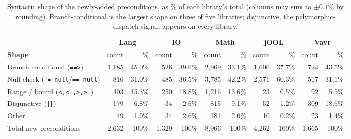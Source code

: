 \begin{table}[ht]
\centering
\small
\caption{Syntactic shape of the newly-added preconditions, as \% of each library's total (columns may sum to $\pm0.1$\% by rounding). Branch-conditional is the largest shape on three of five libraries; disjunctive, the polymorphic-dispatch signal, appears on every library.}
\label{tab:shapes}
\begin{tabular}{lrrrrrrrrrr}
\toprule
& \multicolumn{2}{c}{\textbf{Lang}} & \multicolumn{2}{c}{\textbf{IO}} & \multicolumn{2}{c}{\textbf{Math}} & \multicolumn{2}{c}{\textbf{jOOL}} & \multicolumn{2}{c}{\textbf{Vavr}} \\
\cmidrule(lr){2-3}\cmidrule(lr){4-5}\cmidrule(lr){6-7}\cmidrule(lr){8-9}\cmidrule(lr){10-11}
\textbf{Shape} & count & \% & count & \% & count & \% & count & \% & count & \% \\
\midrule
Branch-conditional (\texttt{==>})       & 1{,}185 & 45.0\% & 526   & 39.6\% & 2{,}969 & 33.1\% & 1{,}606 & 37.7\% & 724 & 43.5\% \\
Null check (\texttt{!= null}/\texttt{== null}) & 816 & 31.0\% & 485   & 36.5\% & 3{,}785  & 42.2\% & 2{,}571 & 60.3\% & 517 & 31.1\% \\
Range / bound (\texttt{<,<=,>,>=})       & 403     & 15.3\% & 250   & 18.8\% & 1{,}216  & 13.6\%  & 23      & 0.5\%  & 92     & 5.5\%  \\
Disjunctive (\texttt{||})                & 179     & 6.8\%  & 34    & 2.6\%  & 815  & 9.1\%  & 52     & 1.2\%  & 309     & 18.6\%  \\
Other                                    & 49      & 1.9\%  & 34    & 2.6\%  & 181      & 2.0\%  & 10      & 0.2\%  & 23      & 1.4\%  \\
\midrule
Total new preconditions                  & 2{,}632 & 100\%  & 1{,}329 & 100\% & 8{,}966 & 100\%  & 4{,}262 & 100\%  & 1{,}665 & 100\%  \\
\bottomrule
\end{tabular}
\end{table}

